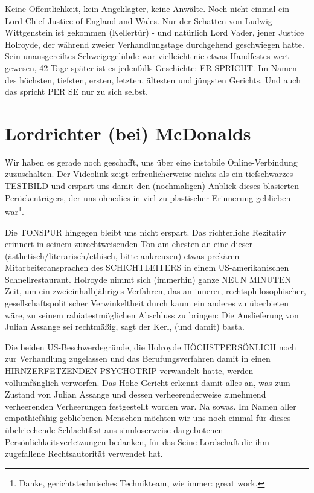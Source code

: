 \begin{multicols}{2}
Keine Öffentlichkeit, kein Angeklagter, keine Anwälte.
Noch nicht einmal ein Lord Chief Justice of England and
Wales. Nur der Schatten von Ludwig Wittgenstein ist gekommen (Kellertür) - und natürlich Lord Vader, jener
Justice Holroyde, der während zweier Verhandlungstage
durchgehend geschwiegen hatte. Sein unausgereiftes
Schweigegelübde war vielleicht nie etwas Handfestes
wert gewesen, 42 Tage später ist es jedenfalls Geschichte:
ER SPRICHT. Im Namen des höchsten, tiefsten, ersten,
letzten, ältesten und jüngsten Gerichts. Und auch das
spricht PER SE nur zu sich selbst.

\section{Lordrichter (bei) McDonalds}

Wir haben es gerade noch geschafft, uns über eine instabile Online-Verbindung zuzuschalten. Der Videolink zeigt erfreulicherweise nichts als ein tiefschwarzes
TESTBILD und erspart uns damit den (nochmaligen)
Anblick dieses blasierten Perückenträgers, der uns ohnedies in viel zu plastischer Erinnerung geblieben war\footnote[28]{Danke, gerichtstechnisches Technikteam, wie immer: great work.}.

Die TONSPUR hingegen bleibt uns nicht erspart. Das
richterliche Rezitativ erinnert in seinem zurechtweisenden Ton am ehesten an eine dieser (ästhetisch/literarisch/ethisch, bitte ankreuzen) etwas prekären Mitarbeiteransprachen des SCHICHTLEITERS in einem
US-amerikanischen Schnellrestaurant. Holroyde nimmt
sich (immerhin) ganze NEUN MINUTEN Zeit, um ein
zweieinhalbjähriges Verfahren, das an innerer, rechtsphilosophischer, gesellschaftspolitischer Verwinkeltheit
durch kaum ein anderes zu überbieten wäre, zu seinem
rabiatestmöglichen Abschluss zu bringen: Die Auslieferung von Julian Assange sei rechtmäßig, sagt der Kerl,
(und damit) basta.

Die beiden US-Beschwerdegründe, die Holroyde
HÖCHSTPERSÖNLICH noch zur Verhandlung zugelassen und das Berufungsverfahren damit in einen
HIRNZERFETZENDEN PSYCHOTRIP verwandelt hatte,
werden vollumfänglich verworfen. Das Hohe Gericht erkennt damit alles an, was zum Zustand von Julian Assange und dessen verheerenderweise zunehmend verheerenden Verheerungen festgestellt worden war. Na sowas.
Im Namen aller empathiefähig gebliebenen Menschen
möchten wir uns noch einmal für dieses übelriechende
Schlachtfest aus sinnloserweise dargebotenen Persönlichkeitsverletzungen bedanken, für das Seine Lordschaft die ihm zugefallene Rechtsautorität verwendet
hat.


\end{multicols}
